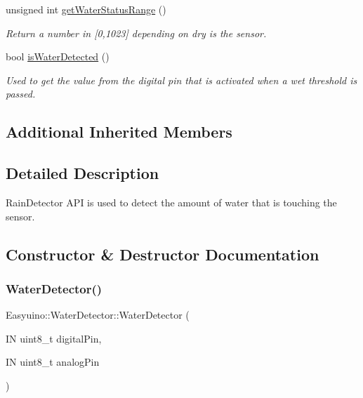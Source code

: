 \begin{DoxyCompactItemize}
unsigned int \hyperlink{class_easyuino_1_1_water_detector_a4a4c4a0ab6ae8a51535762f38b4f0d01}{get\+Water\+Status\+Range} ()
\begin{DoxyCompactList}\small\item\em Return a number in \mbox{[}0,1023\mbox{]} depending on dry is the sensor. \end{DoxyCompactList}\item 
bool \hyperlink{class_easyuino_1_1_water_detector_a9ea69c2eec25543fad47759379d62ce6}{is\+Water\+Detected} ()
\begin{DoxyCompactList}\small\item\em Used to get the value from the digital pin that is activated when a wet threshold is passed. \end{DoxyCompactList}\end{DoxyCompactItemize}
\subsection*{Additional Inherited Members}


\subsection{Detailed Description}
Rain\+Detector A\+PI is used to detect the amount of water that is touching the sensor. 



\subsection{Constructor \& Destructor Documentation}
\mbox{\label{class_easyuino_1_1_water_detector_a33690612b2b89efcfb97d4967b16c617}} 
\subsubsection{\texorpdfstring{Water\+Detector()}{WaterDetector()}}
{\footnotesize\ttfamily Easyuino\+::\+Water\+Detector\+::\+Water\+Detector (\begin{DoxyParamCaption}\item[{IN uint8\+\_\+t}]{digital\+Pin,  }\item[{IN uint8\+\_\+t}]{analog\+Pin }\end{DoxyParamCaption})}



